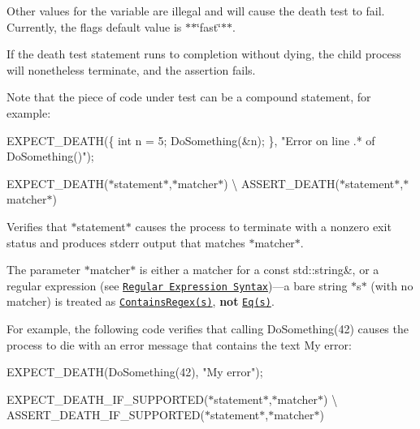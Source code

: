 Other values for the variable are illegal and will cause the death test to fail. Currently, the flag\textquotesingle{}s default value is $\ast$$\ast${\ttfamily \char`\"{}fast\char`\"{}}$\ast$$\ast$.

If the death test statement runs to completion without dying, the child process will nonetheless terminate, and the assertion fails.

Note that the piece of code under test can be a compound statement, for example\+:


\begin{DoxyCode}
EXPECT\_DEATH(\{
  \textcolor{keywordtype}{int} n = 5;
  DoSomething(&n);
\}, \textcolor{stringliteral}{"Error on line .* of DoSomething()"});
\end{DoxyCode}


{\ttfamily E\+X\+P\+E\+C\+T\+\_\+\+D\+E\+A\+TH(}$\ast${\ttfamily statement}$\ast${\ttfamily ,}$\ast${\ttfamily matcher}$\ast${\ttfamily )} \textbackslash{} {\ttfamily A\+S\+S\+E\+R\+T\+\_\+\+D\+E\+A\+TH(}$\ast${\ttfamily statement}$\ast${\ttfamily ,}$\ast${\ttfamily matcher}$\ast${\ttfamily )}

Verifies that $\ast${\ttfamily statement}$\ast$ causes the process to terminate with a nonzero exit status and produces {\ttfamily stderr} output that matches $\ast${\ttfamily matcher}$\ast$.

The parameter $\ast${\ttfamily matcher}$\ast$ is either a matcher for a {\ttfamily const std\+::string\&}, or a regular expression (see \href{../advanced.md#regular-expression-syntax}{\tt Regular Expression Syntax})—a bare string $\ast${\ttfamily s}$\ast$ (with no matcher) is treated as \href{matchers.md#string-matchers}{\tt {\ttfamily Contains\+Regex(s)}}, {\bfseries not} \href{matchers.md#generic-comparison}{\tt {\ttfamily Eq(s)}}.

For example, the following code verifies that calling {\ttfamily Do\+Something(42)} causes the process to die with an error message that contains the text {\ttfamily My error}\+:


\begin{DoxyCode}
EXPECT\_DEATH(DoSomething(42), \textcolor{stringliteral}{"My error"});
\end{DoxyCode}


{\ttfamily E\+X\+P\+E\+C\+T\+\_\+\+D\+E\+A\+T\+H\+\_\+\+I\+F\+\_\+\+S\+U\+P\+P\+O\+R\+T\+ED(}$\ast${\ttfamily statement}$\ast${\ttfamily ,}$\ast${\ttfamily matcher}$\ast${\ttfamily )} \textbackslash{} {\ttfamily A\+S\+S\+E\+R\+T\+\_\+\+D\+E\+A\+T\+H\+\_\+\+I\+F\+\_\+\+S\+U\+P\+P\+O\+R\+T\+ED(}$\ast${\ttfamily statement}$\ast${\ttfamily ,}$\ast${\ttfamily matcher}$\ast${\ttfamily )}

